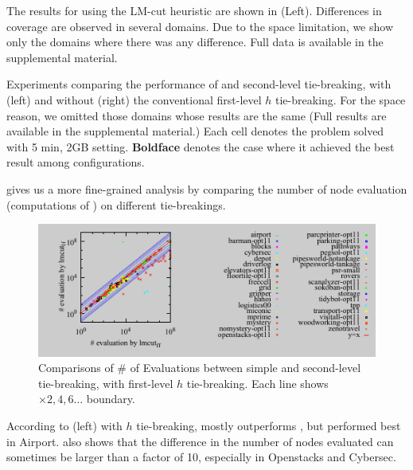 The results for \astar using the LM-cut heuristic \cite{Helmert2009} are
shown in  (Left).
Differences in coverage are observed in several domains.
Due to the space limitation, we show only the domains
where there was any difference. Full data is available in the
supplemental material. 

\begin{table}[tb]
 \centering {}
 
 
 \caption{Experiments comparing the performance of \fifo and \lifo
 second-level tie-breaking, with (left) and without (right) the
 conventional first-level $h$ tie-breaking.  For the space reason, we
 omitted those domains whose results are the same (Full results are
 available in the supplemental material.) Each cell denotes the problem
 solved with 5 min, 2GB setting. \textbf{Boldface} denotes the case
 where it achieved the best result among configurations.}
 \label{single-coverage}
\end{table}

 gives us a
more fine-grained analysis by comparing the number of node evaluation
(computations of \lmcut) on different tie-breakings.

\begin{figure}[tb]
 \centering {}
 \includegraphics{tables/aaai16-30min/aaai16prelim3/evaluated-lmcut_ff-lmcut_lf.pdf}
 \caption{Comparisons of \# of Evaluations between simple \lifo and
 \fifo second-level tie-breaking, with first-level $h$ tie-breaking. Each
 line shows $\times 2,4,6\ldots$ boundary.}  \label{f-h-eval}
\end{figure}

According to  (left) with $h$ tie-breaking, \lifo
mostly outperforms \fifo, but \fifo performed best in Airport.
 also shows that the difference in the number of nodes
evaluated can sometimes be larger than a factor of 10, especially in
Openstacks and Cybersec.

